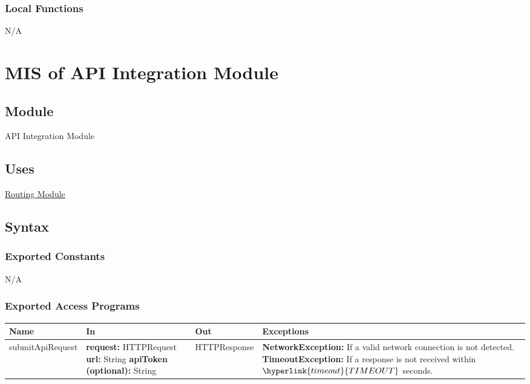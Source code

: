 \documentclass[12pt, titlepage]{article}
\begin{document}
{  \subsubsection{Local Functions}

  N/A

  \section{MIS of API Integration Module}
  \label{sec:AI}

  \subsection{Module}
  API Integration Module
  \subsection{Uses}
  \hyperref[sec:RM]{Routing Module}
  \subsection{Syntax}

  \subsubsection{Exported Constants}
  N/A

  \subsubsection{Exported Access Programs}

  \begin{center}
    \begin{tabular}{>{\raggedright}p{3cm} >{\raggedright}p{5cm}
      >{\raggedright}p{4cm} p{4cm}}
      \hline
      \textbf{Name} & \textbf{In} & \textbf{Out} & \textbf{Exceptions} \\
      \hline
      submitApiRequest & \textbf{request:} HTTPRequest
      \newline \textbf{url:} String \newline \textbf{apiToken
      (optional):} String & HTTPResponse &
      \textbf{NetworkException:} If a valid network connection is not detected.
      \newline \textbf{TimeoutException:} If a response is not received within
      $\hyperlink{timeout}{TIMEOUT}$ seconds.\\
      \hline
    \end{tabular}
  \end{center}

}
\end{document}
